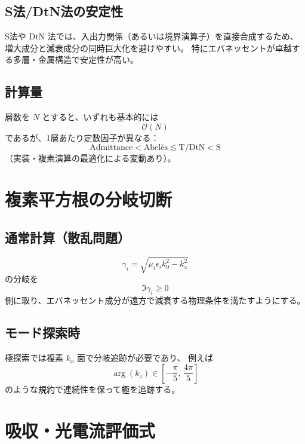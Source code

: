 \documentclass[a4paper,11pt]{article}
\begin{document}
\subsection{S法/DtN法の安定性}
S法や DtN 法では、入出力関係（あるいは境界演算子）を直接合成するため、
増大成分と減衰成分の同時巨大化を避けやすい。
特にエバネッセントが卓越する多層・金属構造で安定性が高い。

\subsection{計算量}
層数を $N$ とすると、いずれも基本的には
\begin{equation}
\mathcal{O}(N)
\end{equation}
であるが、1層あたり定数因子が異なる：
\begin{equation}
\text{Admittance} < \text{Abel\`es} \lesssim \text{T/DtN} < \text{S}
\end{equation}
（実装・複素演算の最適化による変動あり）。

\section{複素平方根の分岐切断}

\subsection{通常計算（散乱問題）}
\begin{equation}
\gamma_i=\sqrt{\mu_i\epsilon_i k_0^2-k_x^2}
\end{equation}
の分岐を
\begin{equation}
\Im \gamma_i \ge 0
\end{equation}
側に取り、エバネッセント成分が遠方で減衰する物理条件を満たすようにする。

\subsection{モード探索時}
極探索では複素 $k_x$ 面で分岐追跡が必要であり、
例えば
\begin{equation}
\arg(k_z)\in\left[-\frac{\pi}{5},\,\frac{4\pi}{5}\right]
\end{equation}
のような規約で連続性を保って極を追跡する。

\section{吸収・光電流評価式}
\end{document}
